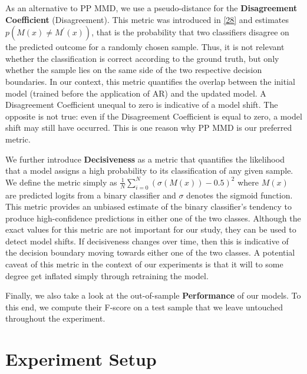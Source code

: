 \documentclass[conference,final,]{IEEEtran}
\theoremstyle{definition}
\theoremstyle{definition}
\theoremstyle{definition}
\theoremstyle{definition}
\theoremstyle{remark}
\begin{document}
As an alternative to PP MMD, we use a pseudo-distance for the \textbf{Disagreement Coefficient} (Disagreement). This metric was introduced in \protect\hyperlink{ref-hanneke2007bound}{{[}28{]}} and estimates \(p(M(x) \neq M^\prime(x))\), that is the probability that two classifiers disagree on the predicted outcome for a randomly chosen sample. Thus, it is not relevant whether the classification is correct according to the ground truth, but only whether the sample lies on the same side of the two respective decision boundaries. In our context, this metric quantifies the overlap between the initial model (trained before the application of AR) and the updated model. A Disagreement Coefficient unequal to zero is indicative of a model shift. The opposite is not true: even if the Disagreement Coefficient is equal to zero, a model shift may still have occurred. This is one reason why PP MMD is our preferred metric.

We further introduce \textbf{Decisiveness} as a metric that quantifies the likelihood that a model assigns a high probability to its classification of any given sample. We define the metric simply as \({\frac{1}{N}}\sum_{i=0}^N(\sigma(M(x)) - 0.5)^2\) where \(M(x)\) are predicted logits from a binary classifier and \(\sigma\) denotes the sigmoid function. This metric provides an unbiased estimate of the binary classifier's tendency to produce high-confidence predictions in either one of the two classes. Although the exact values for this metric are not important for our study, they can be used to detect model shifts. If decisiveness changes over time, then this is indicative of the decision boundary moving towards either one of the two classes. A potential caveat of this metric in the context of our experiments is that it will to some degree get inflated simply through retraining the model.

Finally, we also take a look at the out-of-sample \textbf{Performance} of our models. To this end, we compute their F-score on a test sample that we leave untouched throughout the experiment.

\hypertarget{empirical}{%
\section{Experiment Setup}\label{empirical}}
\end{document}
